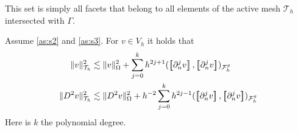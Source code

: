 This set is simply all facets that belong to all elements of the active mesh $\mathcal{T} _{h}$  intersected with $\Gamma $.

\begin{lemma}
    \label{lemma:bi_inv_gh_lemma}
    Assume \ref{as:s2} and \ref{as:s3}.
    For $v \in  V_{h}$ it holds that
        \begin{align}
            \label{eq:bi_inv_gh_1}
        \| v \|_{ \mathcal{T} _{h} }^{ 2 }  & \lesssim  \| v \|_{ \Omega  }^{ 2 }  + \sum_{j=0}^{k} h^{2j+1} ( \jump{ \partial ^{j}_{n} v }, \jump{ \partial ^{j}_{n} v}    )_{\mathcal{F}_{h}^{g}}\\
            \label{eq:bi_inv_gh_2}
        \| D ^2 v \|_{ \mathcal{T} _{h} }^{ 2 }  & \lesssim  \| D^2 v \|_{ \Omega  }^{ 2 }  + h^{-2}\sum_{j=0}^{k} h^{2j-1} ( \jump{ \partial ^{j}_{n} v }, \jump{ \partial ^{j}_{n}v }    )_{\mathcal{F}_{h}^{g}}
        \end{align}
        Here is $k$ the polynomial degree.
\end{lemma}

